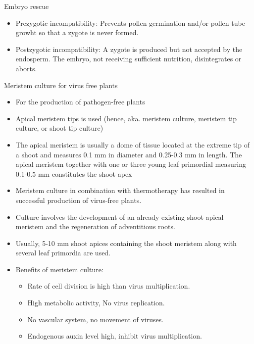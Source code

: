\documentclass[
  ignorenonframetext,
  aspectratio=169]{beamer}
\providecommand{\tightlist}{%
  \setlength{\itemsep}{0pt}\setlength{\parskip}{0pt}}
\begin{document}
\begin{frame}{Embryo rescue}
\protect\hypertarget{embryo-rescue}{}
\begin{itemize}
\tightlist
\item
  Prezygotic incompatibility: Prevents pollen germination and/or pollen
  tube growht so that a zygote is never formed.
\item
  Postzygotic incompatibility: A zygote is produced but not accepted by
  the endosperm. The embryo, not receiving sufficient nutrition,
  disintegrates or aborts.
\end{itemize}
\end{frame}

\begin{frame}{Meristem culture for virus free plants}
\protect\hypertarget{meristem-culture-for-virus-free-plants}{}
\begin{itemize}
\tightlist
\item
  For the production of pathogen-free plants
\item
  Apical meristem tips is used (hence, aka. meristem culture, meristem
  tip culture, or shoot tip culture)
\item
  The apical meristem is usually a dome of tissue located at the extreme
  tip of a shoot and measures 0.1 mm in diameter and 0.25-0.3 mm in
  length. The apical meristem together with one or three young leaf
  primordial measuring 0.1-0.5 mm constitutes the shoot apex
\item
  Meristem culture in combination with thermotherapy has resulted in
  successful production of virus-free plants.
\item
  Culture involves the development of an already existing shoot apical
  meristem and the regeneration of adventitious roots.
\item
  Usually, 5-10 mm shoot apices containing the shoot meristem along with
  several leaf primordia are used.
\end{itemize}
\end{frame}

\begin{frame}{}
\protect\hypertarget{section-14}{}
\begin{itemize}
\tightlist
\item
  Benefits of meristem culture:

  \begin{itemize}
  \tightlist
  \item
    Rate of cell division is high than virus multiplication.
  \item
    High metabolic activity, No virus replication.
  \item
    No vascular system, no movement of viruses.
  \item
    Endogenous auxin level high, inhibit virus multiplication.
  \end{itemize}
\end{itemize}
\end{frame}
\end{document}
